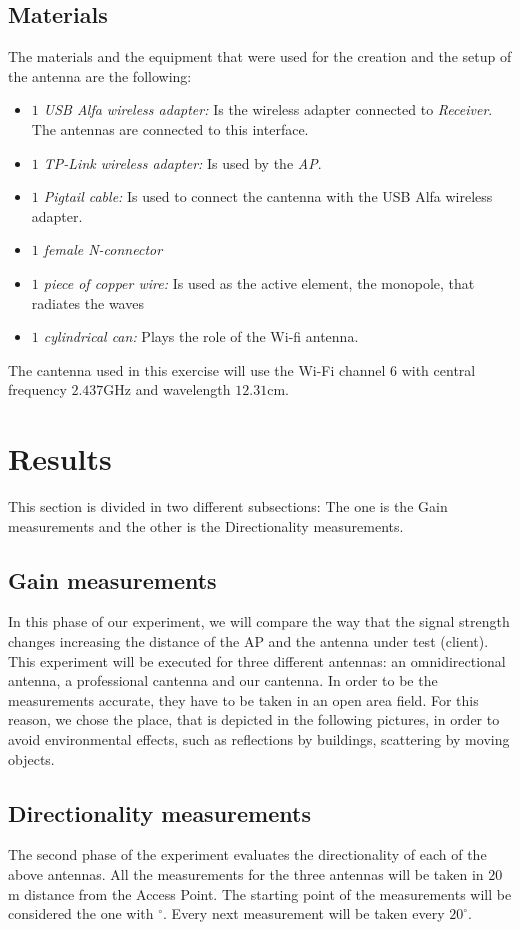 \documentclass[12pt,a4paper]{article}
\newcommand{\rc}[0]{\emph{Receiver}}
\newcommand{\ap}[0]{\emph{AP}}
\begin{document}
	\subsection{Materials}
		The materials and the equipment that were used for the creation and the setup of the antenna are the following: 
		\begin{itemize}
			\item {\emph{$1$ USB Alfa wireless adapter:} Is the wireless adapter connected to \rc. The antennas are connected to this interface.} 
			\item {\emph{$1$ TP-Link wireless adapter:} Is used by the \ap.}
			\item {\emph{$1$ Pigtail cable:} Is used to connect the cantenna with the USB Alfa wireless adapter.}
			\item {\emph{$1$ female N-connector}}
			\item {\emph{$1$ piece of copper wire:} Is used as the active element, the monopole, that radiates the waves}
			\item {\emph{$1$ cylindrical can:} Plays the role of the Wi-fi antenna.} 
		\end{itemize}
		The cantenna used in this exercise will use the Wi-Fi channel $6$ with central frequency $2.437$GHz and wavelength $12.31$cm.


\section{Results}
	This section is divided in two different subsections: The one is the Gain measurements and the other is the Directionality measurements. 
	
	\subsection{Gain measurements}
		In this phase of our experiment, we will compare the way that the signal strength changes increasing the distance of the AP and the antenna under test (client). This experiment will be executed for three different antennas: an omnidirectional antenna, a professional cantenna and our cantenna. In order to be the measurements accurate, they have to be taken in an open area field. For this reason, we chose the place, that is depicted in the following pictures, in order to avoid environmental effects, such as reflections by buildings, scattering by moving objects.
	
	\subsection{Directionality measurements}
		The second phase of the experiment evaluates the directionality of each of the above antennas. All the measurements for the three antennas will be taken in $20$m distance from the Access Point. The starting point of the measurements will be considered the one with $^{\circ}$. Every next measurement will be taken every $20^{\circ}$.
\end{document}
